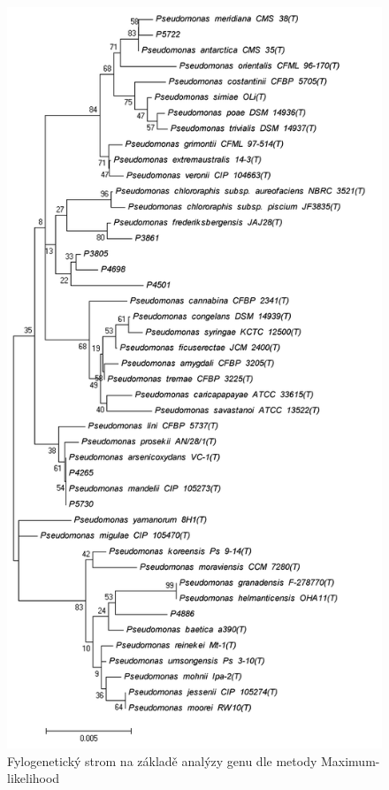 \begin{figure}[h!!!]
  \centering
  \includegraphics[scale=0.50]{text/Pictures/160508_16S_ML_clustalW_Bootstrap-consensus.png}
	\caption{Fylogenetický strom na základě analýzy genu  dle metody Maximum-likelihood}
	\label{rrs_ML}
\end{figure}
\pagebreak

